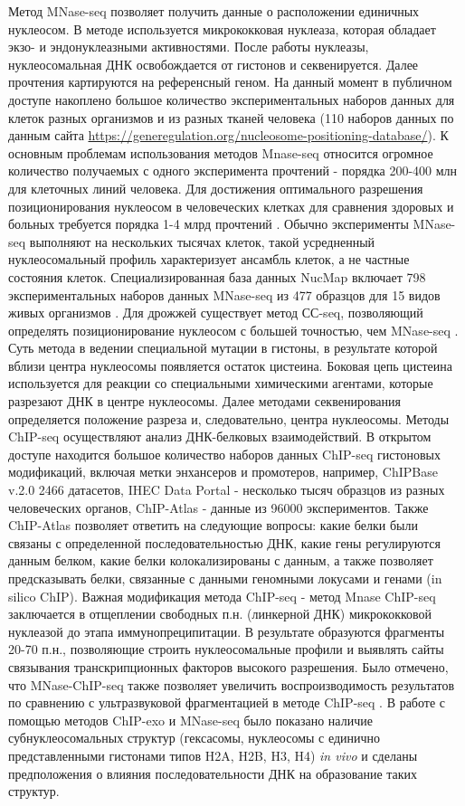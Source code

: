     Метод MNase-seq позволяет получить данные о расположении единичных нуклеосом. В методе используется микрококковая нуклеаза, которая обладает экзо- и эндонуклеазными активностями. После работы нуклеазы, нуклеосомальная ДНК освобождается от гистонов и секвенируется. Далее прочтения картируются на референсный геном.       На данный момент в публичном доступе накоплено большое количество экспериментальных наборов данных для клеток разных организмов и из разных тканей человека (110 наборов данных по данным сайта \url{https://generegulation.org/nucleosome-positioning-database/}).
    К основным проблемам использования методов Mnase-seq относится огромное количество получаемых с одного эксперимента прочтений - порядка 200-400 млн для клеточных линий человека. Для достижения оптимального разрешения позиционирования нуклеосом в человеческих клетках для сравнения здоровых и больных требуется порядка 1-4 млрд прочтений \cite{teif_nucleosome_2016}. Обычно эксперименты MNase-seq выполняют на нескольких тысячах клеток, такой усредненный нуклеосомальный профиль характеризует ансамбль клеток, а не частные состояния клеток. Специализированная база данных NucMap включает 798 экспериментальных наборов данных MNase-seq из 477 образцов для 15 видов живых организмов \cite{zhao_nucmap:_2019}. Для дрожжей существует метод СС-seq, позволяющий определять позиционирование нуклеосом с большей точностью, чем MNase-seq \cite{brogaard_map_2012}. Суть метода в ведении специальной мутации в гистоны, в результате которой вблизи центра нуклеосомы появляется остаток цистеина. Боковая цепь цистеина используется для реакции со специальными химическими агентами, которые разрезают ДНК в центре нуклеосомы. Далее методами секвенирования определяется положение разреза и, следовательно, центра нуклеосомы.
    Методы ChIP-seq осуществляют анализ ДНК-белковых взаимодействий. 
    В открытом доступе находится большое количество наборов данных ChIP-seq гистоновых модификаций, включая метки энхансеров и промотеров, например, ChIPBase v.2.0 2466 датасетов, IHEC Data Portal - несколько тысяч образцов из разных человеческих органов, ChIP-Atlas - данные из 96000 экспериментов. Также ChIP-Atlas позволяет ответить на следующие вопросы: какие белки были связаны с определенной последовательностью ДНК, какие гены регулируются данным белком, какие белки колокализированы с данным, а также позволяет предсказывать белки, связанные с данными геномными локусами и генами (in silico ChIP).
    Важная модификация метода ChIP-seq - метод Mnase ChIP-seq заключается в отщеплении свободных п.н. (линкерной ДНК) микрококковой нуклеазой до этапа иммунопреципитации. В результате образуются фрагменты 20-70 п.н., позволяющие строить нуклеосомальные профили и выявлять сайты связывания транскрипционных факторов высокого разрешения.  Было отмечено, что MNase-ChIP-seq также позволяет увеличить воспроизводимость результатов по сравнению с ультразвуковой фрагментацией в методе ChIP-seq \cite{wedel_genome-wide_2017}. 
    В работе \cite{rhee_subnucleosomal_2014} с помощью методов ChIP-exo и MNase-seq было показано наличие субнуклеосомальных структур (гексасомы, нуклеосомы с единично представленными гистонами типов H2A, H2B, H3, H4) \textit{in vivo} и сделаны предположения о влияния последовательности ДНК на образование таких структур. 

